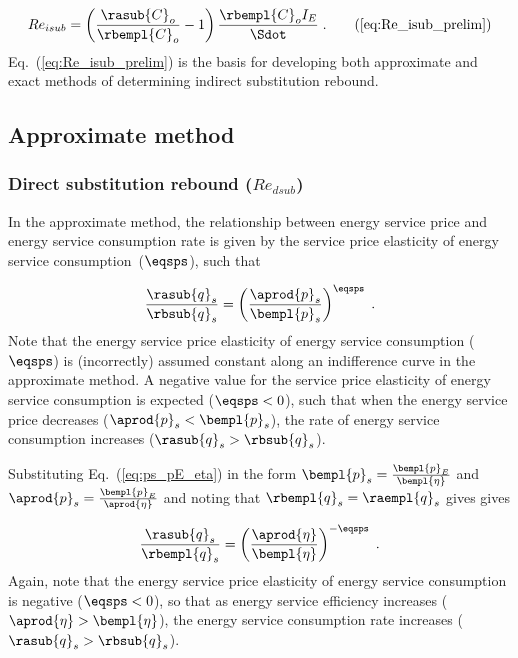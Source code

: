 \begin{equation}
  Re_{isub} = \left(\frac{\rasub{C}_o}{\rbempl{C}_o} - 1  \right) \frac{\rbempl{C}_o I_E }{\Sdot} \; .
                                                        \tag{\ref{eq:Re_isub_prelim}}
\end{equation}
%
Eq.~(\ref{eq:Re_isub_prelim}) is the basis for
developing both approximate and exact methods of determining
indirect substitution rebound.


\subsection{Approximate method}
\label{sec:Resub_approximate_method}


\subsubsection{Direct substitution rebound ($Re_{dsub}$)} 
\label{sec:Redsub_approx}

In the approximate method, 
the relationship between energy service price and energy service consumption rate
is given by the service price elasticity of energy service consumption~($\eqsps$),
such that

\begin{equation}
  \frac{\rasub{q}_s}{\rbsub{q}_s} = \left( \frac{\aprod{p}_s}{\bempl{p}_s} \right)^{\eqsps} \; .
\end{equation}
%
Note that the energy service price elasticity of energy service consumption ($\eqsps$)
is (incorrectly) assumed constant along an indifference curve
in the approximate method. 
A negative value for the service price elasticity of energy service consumption
is expected ($\eqsps < 0$),
such that when the energy service price decreases ($\aprod{p}_s < \bempl{p}_s$),
the rate of energy service consumption increases ($\rasub{q}_s > \rbsub{q}_s$).

Substituting Eq.~(\ref{eq:ps_pE_eta}) in the form
$\bempl{p}_s = \frac{\bempl{p}_E}{\bempl{\eta}}$ and
$\aprod{p}_s = \frac{\bempl{p}_E}{\aprod{\eta}}$
and noting that $\rbempl{q}_s = \raempl{q}_s$ gives
gives

\begin{equation} \label{eq:approx_qshat_over_qsorig}
  \frac{\rasub{q}_s}{\rbempl{q}_s} = \left( \frac{\aprod{\eta}}{\bempl{\eta}} \right)^{-\eqsps} \; .
\end{equation}
%
Again, note that the energy service price elasticity of energy service consumption
is negative ($\eqsps < 0$), so that
as energy service efficiency increases ($\aprod{\eta} > \bempl{\eta}$),
the energy service consumption rate increases ($\rasub{q}_s > \rbsub{q}_s$).

